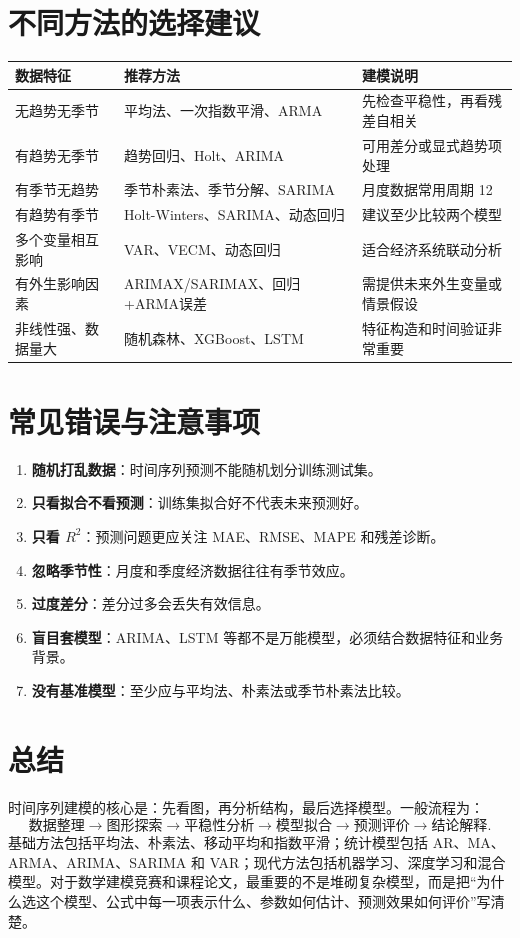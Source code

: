 \documentclass[11pt,a4paper]{ctexart}
\newcommand{\term}[1]{\textbf{#1}}
\begin{document}
\section{不同方法的选择建议}
\begin{longtable}{p{3.2cm}p{4.4cm}p{5.8cm}}
\toprule
数据特征 & 推荐方法 & 建模说明 \\
\midrule
无趋势无季节 & 平均法、一次指数平滑、ARMA & 先检查平稳性，再看残差自相关 \\
有趋势无季节 & 趋势回归、Holt、ARIMA & 可用差分或显式趋势项处理 \\
有季节无趋势 & 季节朴素法、季节分解、SARIMA & 月度数据常用周期 12 \\
有趋势有季节 & Holt-Winters、SARIMA、动态回归 & 建议至少比较两个模型 \\
多个变量相互影响 & VAR、VECM、动态回归 & 适合经济系统联动分析 \\
有外生影响因素 & ARIMAX/SARIMAX、回归+ARMA误差 & 需提供未来外生变量或情景假设 \\
非线性强、数据量大 & 随机森林、XGBoost、LSTM & 特征构造和时间验证非常重要 \\
\bottomrule
\end{longtable}

\section{常见错误与注意事项}
\begin{enumerate}
  \item \term{随机打乱数据}：时间序列预测不能随机划分训练测试集。
  \item \term{只看拟合不看预测}：训练集拟合好不代表未来预测好。
  \item \term{只看 $R^2$}：预测问题更应关注 MAE、RMSE、MAPE 和残差诊断。
  \item \term{忽略季节性}：月度和季度经济数据往往有季节效应。
  \item \term{过度差分}：差分过多会丢失有效信息。
  \item \term{盲目套模型}：ARIMA、LSTM 等都不是万能模型，必须结合数据特征和业务背景。
  \item \term{没有基准模型}：至少应与平均法、朴素法或季节朴素法比较。
\end{enumerate}

\section{总结}
时间序列建模的核心是：先看图，再分析结构，最后选择模型。一般流程为：
\[
\text{数据整理}\rightarrow \text{图形探索}\rightarrow \text{平稳性分析}\rightarrow \text{模型拟合}\rightarrow \text{预测评价}\rightarrow \text{结论解释}.
\]
基础方法包括平均法、朴素法、移动平均和指数平滑；统计模型包括 AR、MA、ARMA、ARIMA、SARIMA 和 VAR；现代方法包括机器学习、深度学习和混合模型。对于数学建模竞赛和课程论文，最重要的不是堆砌复杂模型，而是把“为什么选这个模型、公式中每一项表示什么、参数如何估计、预测效果如何评价”写清楚。
\end{document}
